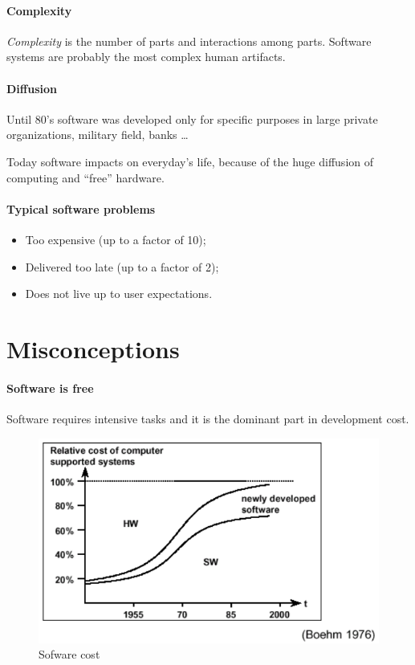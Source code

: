 \paragraph{Complexity}
\emph{Complexity} is the number of parts and interactions among parts. Software systems are probably the most complex human artifacts.

\paragraph{Diffusion}
Until 80's software was developed only for specific purposes in large private organizations, military field, banks \dots

Today software impacts on everyday's life, because of the huge diffusion of computing and ``free'' hardware.

\paragraph{Typical software problems}
\begin{itemize}
\item Too expensive (up to a factor of 10);
\item Delivered too late (up to a factor of 2);
\item Does not live up to user expectations.
\end{itemize}

\section{Misconceptions}
\paragraph{Software is free} Software requires intensive tasks and it is the dominant part in development cost.

\begin{figure}[hbtp]
\centering
\includegraphics[scale=0.4]{images/software_cost.png}
\caption{Sofware cost}
\end{figure}


